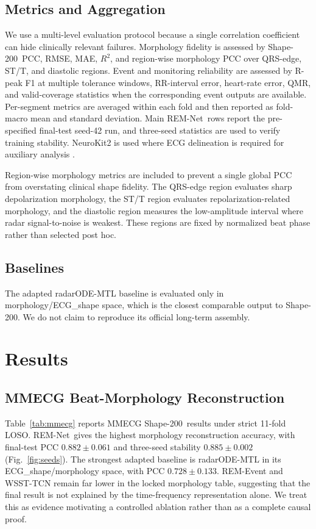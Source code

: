 \documentclass[lettersize,journal]{IEEEtran}
\newcommand{\remnet}{REM-Net\xspace}
\newcommand{\shape}{Shape-200\xspace}
\begin{document}
\subsection{Metrics and Aggregation}
We use a multi-level evaluation protocol because a single correlation coefficient can hide clinically relevant failures. Morphology fidelity is assessed by \shape\ PCC, RMSE, MAE, $R^2$, and region-wise morphology PCC over QRS-edge, ST/T, and diastolic regions. Event and monitoring reliability are assessed by R-peak F1 at multiple tolerance windows, RR-interval error, heart-rate error, QMR, and valid-coverage statistics when the corresponding event outputs are available. Per-segment metrics are averaged within each fold and then reported as fold-macro mean and standard deviation. Main \remnet\ rows report the pre-specified final-test seed-42 run, and three-seed statistics are used to verify training stability. NeuroKit2 is used where ECG delineation is required for auxiliary analysis \cite{neurokit2}.

Region-wise morphology metrics are included to prevent a single global PCC from overstating clinical shape fidelity. The QRS-edge region evaluates sharp depolarization morphology, the ST/T region evaluates repolarization-related morphology, and the diastolic region measures the low-amplitude interval where radar signal-to-noise is weakest. These regions are fixed by normalized beat phase rather than selected post hoc.

\subsection{Baselines}

The adapted radarODE-MTL baseline is evaluated only in morphology/ECG\_shape space, which is the closest comparable output to \shape. We do not claim to reproduce its official long-term assembly.

\section{Results}

\subsection{MMECG Beat-Morphology Reconstruction}
Table~\ref{tab:mmecg} reports MMECG \shape\ results under strict 11-fold LOSO. \remnet\ gives the highest morphology reconstruction accuracy, with final-test PCC $0.882 \pm 0.061$ and three-seed stability $0.885 \pm 0.002$ (Fig.~\ref{fig:seeds}). The strongest adapted baseline is radarODE-MTL in its ECG\_shape/morphology space, with PCC $0.728 \pm 0.133$. REM-Event and WSST-TCN remain far lower in the locked morphology table, suggesting that the final result is not explained by the time-frequency representation alone. We treat this as evidence motivating a controlled ablation rather than as a complete causal proof.
\end{document}
